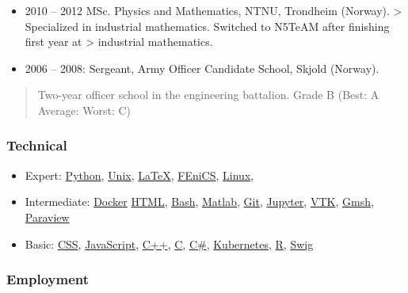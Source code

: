 \documentclass[11pt, a4paper]{article}
\providecommand{\tightlist}{%
  \setlength{\itemsep}{0pt}\setlength{\parskip}{0pt}}
\begin{document}
\begin{raggedright}
\begin{itemize}
\item
  2010 -- 2012 MSc. Physics and Mathematics, NTNU, Trondheim (Norway).
  \textgreater{} Specialized in industrial mathematics. Switched to
  N5TeAM after finishing first year at \textgreater{} industrial
  mathematics.
\item
  2006 -- 2008: Sergeant, Army Officer Candidate School, Skjold
  (Norway).
\end{itemize}

\begin{quote}
Two-year officer school in the engineering battalion. Grade B (Best: A
Average: Worst: C)
\end{quote}

\hypertarget{technical}{%
\subsubsection{Technical}\label{technical}}

\begin{itemize}
\tightlist
\item
  Expert: \href{https://www.python.org}{Python},
  \href{https://en.wikipedia.org/wiki/Unix}{Unix},
  \href{https://www.latex-project.org}{LaTeX},
  \href{https://fenicsproject.org}{FEniCS},
  \href{https://en.wikipedia.org/wiki/Linux}{Linux},
\item
  Intermediate: \href{https://www.docker.com}{Docker}
  \href{https://en.wikipedia.org/wiki/HTML}{HTML},
  \href{https://en.wikipedia.org/wiki/Bash_(Unix_shell)}{Bash},
  \href{https://se.mathworks.com/products/matlab.html}{Matlab},
  \href{https://git-scm.com}{Git}, \href{http://jupyter.org}{Jupyter},
  \href{https://www.vtk.org}{VTK}, \href{http://gmsh.info}{Gmsh},
  \href{https://www.paraview.org}{Paraview}
\item
  Basic:
  \href{https://en.wikipedia.org/wiki/Cascading_Style_Sheets}{CSS},
  \href{https://en.wikipedia.org/wiki/JavaScript}{JavaScript},
  \href{https://en.wikipedia.org/wiki/C\%2B\%2B}{C++},
  \href{https://en.wikipedia.org/wiki/C_(programming_language)}{C},
  \href{https://en.wikipedia.org/wiki/C_Sharp_(programming_language)}{C\#},
  \href{https://kubernetes.io}{Kubernetes},
  \href{https://www.r-project.org/about.html}{R},
  \href{http://www.swig.org}{Swig}
\end{itemize}

\hypertarget{employment}{%
\subsubsection{Employment}\label{employment}}


\end{raggedright}
\end{document}
